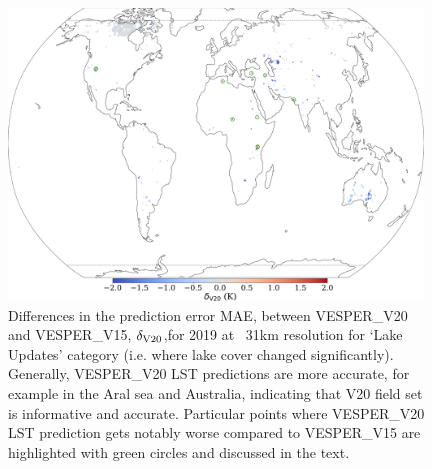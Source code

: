 \documentclass[hess, twostagejnl]{copernicus}
\begin{document}
\begin{figure}[t]
	\includegraphics[width=0.98\textwidth]{updated_lakes_plot}
	\caption{Differences in the prediction error MAE, between VESPER\_V20 and VESPER\_V15, $\delta_{\rm V20}$,for 2019 at ~31km resolution for ‘Lake Updates’ category (i.e. where lake cover changed significantly). Generally, VESPER\_V20 LST predictions are more accurate, for example in the Aral sea and Australia, indicating that V20 field set is informative and accurate. Particular points where VESPER\_V20 LST prediction gets notably worse compared to VESPER\_V15 are highlighted with green circles and discussed in the text.}
	\label{fig:bitstring_100110}
\end{figure}

\end{document}
